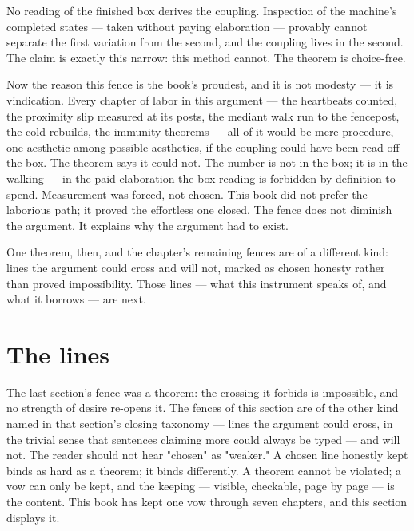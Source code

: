 \begin{fence}
No reading of the finished box derives the coupling. Inspection of the machine's
completed states --- taken without paying elaboration --- provably cannot separate
the first variation from the second, and the coupling lives in the second. The
claim is exactly this narrow: this method cannot. The theorem is choice-free.
\end{fence}

Now the reason this fence is the book's proudest, and it is not modesty --- it is
vindication. Every chapter of labor in this argument --- the heartbeats counted,
the proximity slip measured at its posts, the mediant walk run to the fencepost,
the cold rebuilds, the immunity theorems --- all of it would be mere procedure,
one aesthetic among possible aesthetics, if the coupling could have been read off
the box. The theorem says it could not. The number is not in the box; it is in
the walking --- in the paid elaboration the box-reading is forbidden by
definition to spend. Measurement was forced, not chosen. This book did not prefer
the laborious path; it proved the effortless one closed. The fence does not
diminish the argument. It explains why the argument had to exist.

One theorem, then, and the chapter's remaining fences are of a different kind:
lines the argument could cross and will not, marked as chosen honesty rather
than proved impossibility. Those lines --- what this instrument speaks of, and
what it borrows --- are next.

\section{The lines}

The last section's fence was a theorem: the crossing it forbids is impossible, and
no strength of desire re-opens it. The fences of this section are of the other
kind named in that section's closing taxonomy --- lines the argument could cross,
in the trivial sense that sentences claiming more could always be typed --- and
will not. The reader should not hear "chosen" as "weaker." A chosen line honestly
kept binds as hard as a theorem; it binds differently. A theorem cannot be
violated; a vow can only be kept, and the keeping --- visible, checkable, page by
page --- is the content. This book has kept one vow through seven chapters, and
this section displays it.

